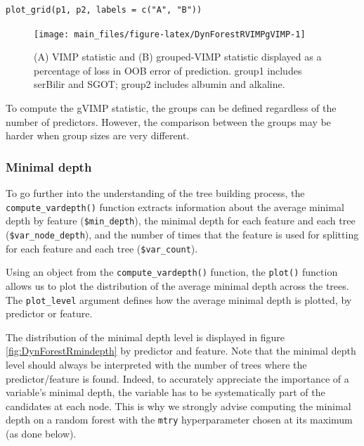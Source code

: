 \begin{verbatim}
plot_grid(p1, p2, labels = c("A", "B"))
\end{verbatim}

\begin{figure}

{\centering \texttt{[image: main\_files/figure-latex/DynForestRVIMPgVIMP-1]} 

}

\caption{(A) VIMP statistic and (B) grouped-VIMP statistic displayed as a percentage of loss in OOB error of prediction. group1 includes serBilir and SGOT; group2 includes albumin and alkaline.}\label{fig:DynForestRVIMPgVIMP}
\end{figure}

To compute the gVIMP statistic, the groups can be defined regardless of the number of predictors. However, the comparison between the groups may be harder when group sizes are very different.

\subsubsection{Minimal depth}\label{minimal-depth-1}

To go further into the understanding of the tree building process, the \texttt{compute\_vardepth()} function extracts information about the average minimal depth by feature (\texttt{\$min\_depth}), the minimal depth for each feature and each tree (\texttt{\$var\_node\_depth}), and the number of times that the feature is used for splitting for each feature and each tree (\texttt{\$var\_count}).

Using an object from the \texttt{compute\_vardepth()} function, the \texttt{plot()} function allows us to plot the distribution of the average minimal depth across the trees. The \texttt{plot\_level} argument defines how the average minimal depth is plotted, by predictor or feature.

The distribution of the minimal depth level is displayed in figure \ref{fig:DynForestRmindepth} by predictor and feature. Note that the minimal depth level should always be interpreted with the number of trees where the predictor/feature is found. Indeed, to accurately appreciate the importance of a variable's minimal depth, the variable has to be systematically part of the candidates at each node. This is why we strongly advise computing the minimal depth on a random forest with the \texttt{mtry} hyperparameter chosen at its maximum (as done below).

